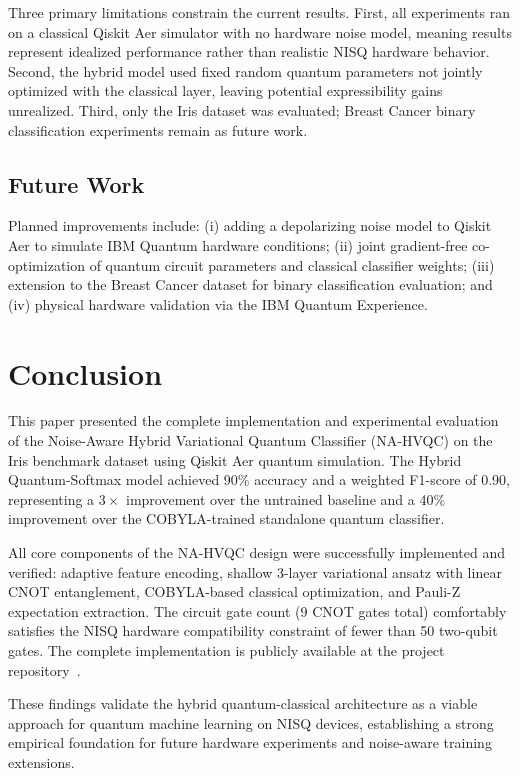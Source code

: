 \documentclass[conference]{IEEEtran}
\begin{document}
Three primary limitations constrain the current results. First, all experiments ran on a classical Qiskit Aer simulator with no hardware noise model, meaning results represent idealized performance rather than realistic NISQ hardware behavior. Second, the hybrid model used fixed random quantum parameters not jointly optimized with the classical layer, leaving potential expressibility gains unrealized. Third, only the Iris dataset was evaluated; Breast Cancer binary classification experiments remain as future work.

\subsection{Future Work}

Planned improvements include: (i) adding a depolarizing noise model to Qiskit Aer to simulate IBM Quantum hardware conditions; (ii) joint gradient-free co-optimization of quantum circuit parameters and classical classifier weights; (iii) extension to the Breast Cancer dataset for binary classification evaluation; and (iv) physical hardware validation via the IBM Quantum Experience.

\section{Conclusion}

This paper presented the complete implementation and experimental evaluation of the Noise-Aware Hybrid Variational Quantum Classifier (NA-HVQC) on the Iris benchmark dataset using Qiskit Aer quantum simulation. The Hybrid Quantum-Softmax model achieved 90\% accuracy and a weighted F1-score of 0.90, representing a $3\times$ improvement over the untrained baseline and a 40\% improvement over the COBYLA-trained standalone quantum classifier.

All core components of the NA-HVQC design were successfully implemented and verified: adaptive feature encoding, shallow 3-layer variational ansatz with linear CNOT entanglement, COBYLA-based classical optimization, and Pauli-Z expectation extraction. The circuit gate count (9 CNOT gates total) comfortably satisfies the NISQ hardware compatibility constraint of fewer than 50 two-qubit gates. The complete implementation is publicly available at the project repository~\cite{kabeer2025github}.

These findings validate the hybrid quantum-classical architecture as a viable approach for quantum machine learning on NISQ devices, establishing a strong empirical foundation for future hardware experiments and noise-aware training extensions.
\end{document}
